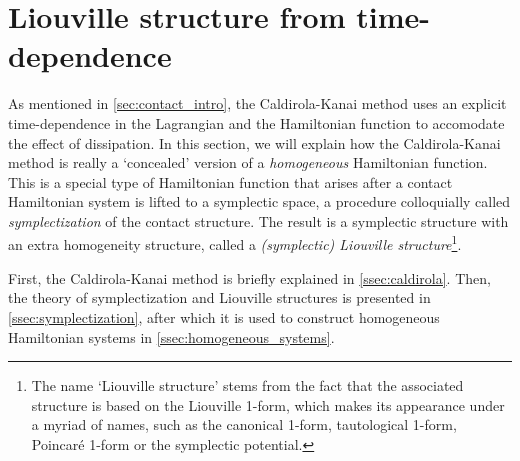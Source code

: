 \section{Liouville structure from time-dependence}
\label{sec:liouville}
As mentioned in \cref{sec:contact_intro}, the Caldirola-Kanai method uses an explicit time-dependence in the Lagrangian and the Hamiltonian function to accomodate the effect of dissipation. In this section, we will explain how the Caldirola-Kanai method is really a `concealed' version of a \emph{homogeneous} Hamiltonian function. This is a special type of Hamiltonian function that arises after a contact Hamiltonian system is lifted to a symplectic space, a procedure colloquially called \emph{symplectization} of the contact structure. The result is a symplectic structure with an extra homogeneity structure, called a \emph{(symplectic) Liouville structure}\footnote{The name `Liouville structure' stems from the fact that the associated structure is based on the Liouville 1-form, which makes its appearance under a myriad of names, such as the canonical 1-form, tautological 1-form, Poincaré 1-form or the symplectic potential. }.

First, the Caldirola-Kanai method is briefly explained in \cref{ssec:caldirola}. Then, the theory of symplectization and Liouville structures is presented in \cref{ssec:symplectization}, after which it is used to construct homogeneous Hamiltonian systems in \cref{ssec:homogeneous_systems}.

